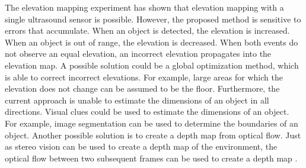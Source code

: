 The elevation mapping experiment has shown that elevation mapping with a single ultrasound sensor is possible.
However, the proposed method is sensitive to errors that accumulate.
When an object is detected, the elevation is increased.
When an object is out of range, the elevation is decreased.
When both events do not observe an equal elevation, an incorrect elevation propagates into the elevation map.
A possible solution could be a global optimization method, which is able to correct incorrect elevations.
For example, large areas for which the elevation does not change can be assumed to be the floor.
Furthermore, the current approach is unable to estimate the dimensions of an object in all directions.
Visual clues could be used to estimate the dimensions of an object.
For example, image segmentation can be used to determine the boundaries of an object.
Another possible solution is to create a depth map from optical flow.
Just as stereo vision can be used to create a depth map of the environment, the optical flow between two subsequent frames can be used to create a depth map \cite{Jurriaans2011}.